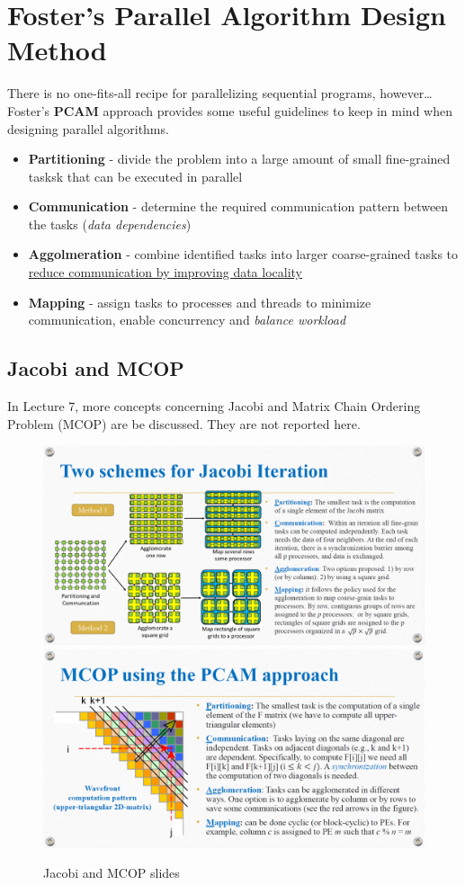 \section{Foster's Parallel Algorithm Design Method}
There is no one-fits-all recipe for parallelizing sequential programs, however\dots Foster's \textbf{PCAM} approach provides some useful guidelines to keep in mind when designing parallel algorithms.

\begin{itemize}
   \item \textbf{Partitioning} - divide the problem into a large amount of small fine-grained tasksk that can be executed in parallel
   \item \textbf{Communication} - determine the required communication pattern between the tasks (\textit{data dependencies})
   \item \textbf{Aggolmeration} - combine identified tasks into larger coarse-grained tasks to \ul{reduce communication by improving data locality}
   \item \textbf{Mapping} - assign tasks to processes and threads to minimize communication, enable concurrency and \textit{balance workload}
\end{itemize}

\subsection{Jacobi and MCOP}

In Lecture 7, more concepts concerning Jacobi and Matrix Chain Ordering Problem (MCOP) are be discussed.
They are not reported here.

\begin{figure}[htbp]
   \centering
   \includegraphics{images/05/jacobi.png}
   \includegraphics{images/05/mcop.png}
   \caption{Jacobi and MCOP slides}
   \label{fig:05/jacobi_mcop}
\end{figure}